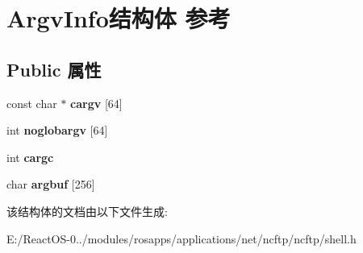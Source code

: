 \hypertarget{struct_argv_info}{}\section{Argv\+Info结构体 参考}
\label{struct_argv_info}
\subsection*{Public 属性}
\begin{DoxyCompactItemize}
\item 
\mbox{\label{struct_argv_info_a5ae64a6551206e7b0d7a77f8064045ec}} 
const char $\ast$ {\bfseries cargv} \mbox{[}64\mbox{]}
\item 
\mbox{\label{struct_argv_info_a3b9479fe53097a83a37185a6c93281fa}} 
int {\bfseries noglobargv} \mbox{[}64\mbox{]}
\item 
\mbox{\label{struct_argv_info_a1a3fcf11ed7bdd603c393a97ea4637d1}} 
int {\bfseries cargc}
\item 
\mbox{\label{struct_argv_info_a87e03b6f5ee0faea60fd9bfa9e0c0332}} 
char {\bfseries argbuf} \mbox{[}256\mbox{]}
\end{DoxyCompactItemize}


该结构体的文档由以下文件生成\+:\begin{DoxyCompactItemize}
\item 
E\+:/\+React\+O\+S-\/0../modules/rosapps/applications/net/ncftp/ncftp/shell.\+h\end{DoxyCompactItemize}
